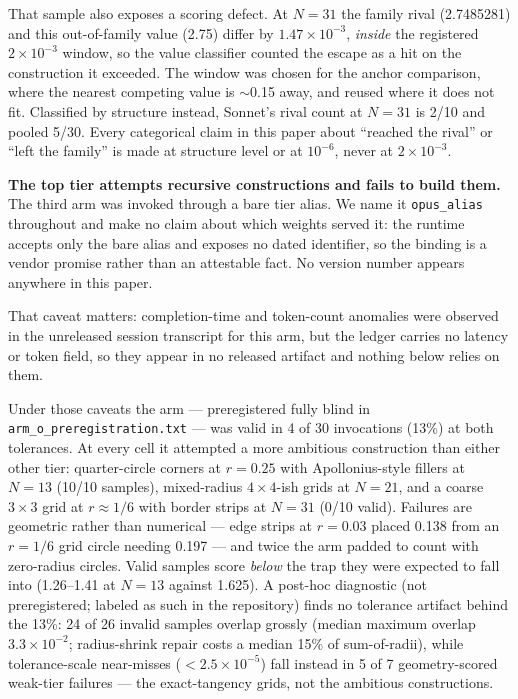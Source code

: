 That sample also exposes a scoring defect. At $N = 31$ the family rival (2.7485281) and this
out-of-family value (2.75) differ by $1.47\times10^{-3}$, \emph{inside} the registered $2\times10^{-3}$ window, so the
value classifier counted the escape as a hit on the construction it exceeded. The window was
chosen for the anchor comparison, where the nearest competing value is $\sim$0.15 away, and reused
where it does not fit. Classified by structure instead, Sonnet's rival count at $N = 31$ is 2/10
and pooled 5/30. Every categorical claim in this paper about ``reached the
rival'' or ``left the family'' is made at structure level or at $10^{-6}$, never at $2\times10^{-3}$.

\textbf{The top tier attempts recursive constructions and fails to build them.} The third arm was
invoked through a bare tier alias. We name it \texttt{opus\_alias} throughout and make no claim about
which weights served it: the runtime accepts only the bare alias and exposes no dated
identifier, so the binding is a vendor promise rather than an attestable fact. No version number
appears anywhere in this paper.

That caveat matters: completion-time and token-count anomalies were observed in the unreleased
session transcript for this arm, but the ledger carries no latency or token field, so they
appear in no released artifact and nothing below relies on them.

Under those caveats the arm --- preregistered fully blind in \texttt{arm\_o\_preregistration.txt} --- was
valid in 4 of 30 invocations (13\%) at both tolerances. At every cell it attempted a more
ambitious construction than either other tier: quarter-circle corners at $r = 0.25$ with
Apollonius-style fillers at $N = 13$ (10/10 samples), mixed-radius $4 \times 4$-ish grids at $N = 21$, and a
coarse $3 \times 3$ grid at $r \approx 1/6$ with border strips at $N = 31$ (0/10 valid). Failures are geometric
rather than numerical --- edge strips at $r = 0.03$ placed 0.138 from an $r = 1/6$ grid circle needing
0.197 --- and twice the arm padded to count with zero-radius circles. Valid samples score \emph{below}
the trap they were expected to fall into (1.26--1.41 at $N = 13$ against 1.625). A post-hoc
diagnostic (not preregistered; labeled as such in the repository) finds no tolerance
artifact behind the 13\%: 24 of 26 invalid samples overlap grossly (median maximum overlap
$3.3\times10^{-2}$; radius-shrink repair costs a median 15\% of sum-of-radii), while tolerance-scale
near-misses ($< 2.5\times10^{-5}$) fall instead in 5 of 7 geometry-scored weak-tier failures --- the
exact-tangency grids, not the ambitious constructions.


